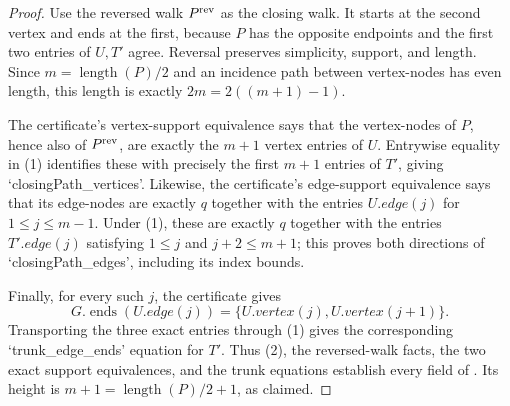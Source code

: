 \begin{proof}
Use the reversed walk $P^{\rm rev}$ as the closing walk.  It starts at
the second vertex and ends at the first, because $P$ has the opposite
endpoints and the first two entries of $U,T'$ agree.  Reversal preserves
simplicity, support, and length.  Since $m=\operatorname{length}(P)/2$
and an incidence path between vertex-nodes has even length, this length is
exactly $2m=2((m+1)-1)$.

The certificate's vertex-support equivalence says that the vertex-nodes
of $P$, hence also of $P^{\rm rev}$, are exactly the $m+1$ vertex entries
of $U$.  Entrywise equality in (1) identifies these with precisely the
first $m+1$ entries of $T'$, giving `closingPath_vertices'.  Likewise,
the certificate's edge-support equivalence says that its edge-nodes are
exactly $q$ together with the entries $U.edge(j)$ for
$1\leq j\leq m-1$.  Under (1), these are exactly $q$ together with the
entries $T'.edge(j)$ satisfying
$1\leq j$ and $j+2\leq m+1$; this proves both directions of
`closingPath_edges', including its index bounds.

Finally, for every such $j$, the certificate gives
\[
 G.\operatorname{ends}(U.edge(j))
   =\{U.vertex(j),U.vertex(j+1)\}.
\]
Transporting the three exact entries through (1) gives the corresponding
`trunk_edge_ends' equation for $T'$.  Thus (2), the reversed-walk facts,
the two exact support equivalences, and the trunk equations establish
every field of .  Its height is
$m+1=\operatorname{length}(P)/2+1$, as claimed.
\end{proof}
